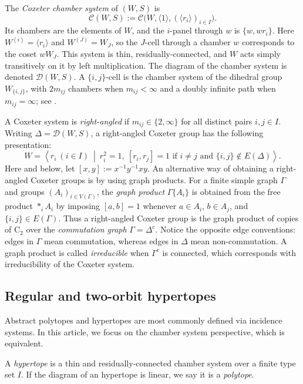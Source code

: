 \documentclass[10pt,a4paper]{amsart}
\newcommand{\DD}{\mathcal{D}}
\newcommand{\CC}{\mathcal{C}}
\newcommand{\Cyc}{\mathrm{C}}
\begin{document}
The \emph{Coxeter chamber system} of $(W,S)$ is
\[
    \CC(W,S):=\CC\bigl(W,\langle 1\rangle,(\langle r_i\rangle)_{i\in I}\bigr).
\]
Its chambers are the elements of $W$, and the $i$-panel through $w$ is
$\{w,wr_i\}$.  Here $W^{(i)}=\langle r_i\rangle$ and $W^{(J)}=W_J$, so the
$J$-cell through a chamber $w$ corresponds to the coset $wW_J$.  This system is thin,
residually-connected, and $W$ acts simply transitively on it by left
multiplication.  The diagram of the chamber system is denoted $\DD(W,S)$. A $\{i,j\}$-cell is the chamber
system of the dihedral group $W_{\{i,j\}}$, with $2m_{ij}$ chambers when
$m_{ij}<\infty$ and a doubly infinite path when $m_{ij}=\infty$; see
\cite[Sections~4.1-4.2 and Corollary~4.5.16]{buekenhout2013diagram}.

A Coxeter system is \emph{right-angled} if $m_{ij}\in\{2,\infty\}$ for
all distinct pairs $i,j\in I$.  Writing $\Delta=\DD(W,S)$, a right-angled Coxeter group has the following presentation:
\[
    W=\left\langle r_i\ (i\in I)\ \middle|\
        r_i^2=1,\ [r_i,r_j]=1
        \text{ if }i\neq j\text{ and }\{i,j\}\notin E(\Delta)\right\rangle.
\]
Here and below, let $[x,y]:=x^{-1}y^{-1}xy$. An alternative way of obtaining a right-angled Coxeter groups is by using graph products.
For a finite simple graph $\Gamma$ and groups $(A_i)_{i\in V(\Gamma)}$, the
\emph{graph product} $\Gamma\{A_i\}$ is obtained from the free product
$\ast_i A_i$ by imposing $[a,b]=1$ whenever $a\in A_i$, $b\in A_j$, and
$\{i,j\}\in E(\Gamma)$. Thus a right-angled Coxeter group is the graph
product of copies of $\Cyc_2$ over the \emph{commutation graph}
$\Gamma=\Delta^c$.  Notice the opposite edge conventions: edges in
$\Gamma$ mean commutation, whereas edges in $\Delta$ mean non-commutation.
A graph product is called \emph{irreducible} when $\Gamma^c$ is connected,
which corresponds with irreducibility of the Coxeter system.


\subsection{Regular and two-orbit hypertopes}\label{sec:RegTwoOrbHyper}

Abstract polytopes and hypertopes are most commonly defined via incidence systems. In this article, we focus on the chamber system perspective, which is equivalent.

A \emph{hypertope} is a thin and residually-connected chamber system over a finite type set $I$. If the diagram of an hypertope is linear, we say it is a \emph{polytope}.
\end{document}
